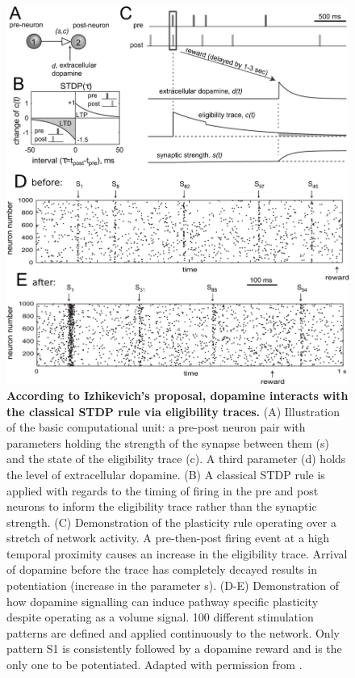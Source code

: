     \begin{figure}[!htb]
        \centering
        \includegraphics[width=12cm]{chapter1/figures/izhiIllustration/izhiIllustration.png}
        \caption[The Izhikevich proposal for a plasticity rule involving dopamine]{\textbf{According to Izhikevich's proposal, dopamine interacts with the classical STDP rule via eligibility traces.} (A) Illustration of the basic computational unit: a pre-post neuron pair with parameters holding the strength of the synapse between them (s) and the state of the eligibility trace (c). A third parameter (d) holds the level of extracellular dopamine. (B) A classical STDP rule is applied with regards to the timing of firing in the pre and post neurons to inform the eligibility trace rather than the synaptic strength. (C) Demonstration of the plasticity rule operating over a stretch of network activity. A pre-then-post firing event at a high temporal proximity causes an increase in the eligibility trace. Arrival of dopamine before the trace has completely decayed results in potentiation (increase in the parameter s). (D-E) Demonstration of how dopamine signalling can induce pathway specific plasticity despite operating as a volume signal. 100 different stimulation patterns are defined and applied continuously to the network. Only pattern S1 is consistently followed by a dopamine reward and is the only one to be potentiated. Adapted with permission from \cite{izhikevich2007solving}.}
        \label{fig:introduction:izhi}
    \end{figure}


